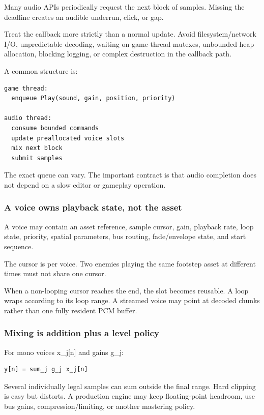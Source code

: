 Many audio APIs periodically request the next block of samples. Missing the deadline creates an audible underrun, click, or gap.

Treat the callback more strictly than a normal update. Avoid filesystem/network I/O, unpredictable decoding, waiting on game-thread mutexes, unbounded heap allocation, blocking logging, or complex destruction in the callback path.

A common structure is:

\begin{verbatim}
game thread:
  enqueue Play(sound, gain, position, priority)

audio thread:
  consume bounded commands
  update preallocated voice slots
  mix next block
  submit samples
\end{verbatim}

The exact queue can vary. The important contract is that audio completion does not depend on a slow editor or gameplay operation.

\subsubsection{A voice owns playback state, not the asset}\label{05-engine-i-ch009-a-voice-owns-playback-state-not-the-asset}

A voice may contain an asset reference, sample cursor, gain, playback rate, loop state, priority, spatial parameters, bus routing, fade/envelope state, and start sequence.

The cursor is per voice. Two enemies playing the same footstep asset at different times must not share one cursor.

When a non-looping cursor reaches the end, the slot becomes reusable. A loop wraps according to its loop range. A streamed voice may point at decoded chunks rather than one fully resident PCM buffer.

\subsubsection{Mixing is addition plus a level policy}\label{05-engine-i-ch009-mixing-is-addition-plus-a-level-policy}

For mono voices x\_j{[}n{]} and gains g\_j:

\begin{verbatim}
y[n] = sum_j g_j x_j[n]
\end{verbatim}

Several individually legal samples can sum outside the final range. Hard clipping is easy but distorts. A production engine may keep floating-point headroom, use bus gains, compression/limiting, or another mastering policy.

